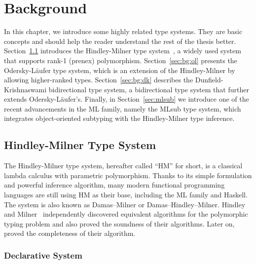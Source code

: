 \chapter{Background}
\label{chap:Background}

In this chapter, we introduce some highly related type systems.
They are basic concepts and should help the reader
understand the rest of the thesis better.
Section~\ref{sec:bg:hm} introduces the
Hindley-Milner type system~\citep{hindley1969principal,
milner1978theory,damas1982principal},
a widely used system that supports rank-1 (prenex) polymorphism.
Section~\ref{sec:bg:ol} presents the Odersky-L\"aufer type system,
which is an extension of the Hindley-Milner by allowing higher-ranked types.
Section~\ref{sec:bg:dk} describes the Dunfield-Krishnaswami
bidirectional type system,
a bidirectional type system that further extends Odersky-L\"aufer's.
Finally, in Section~\ref{sec:mlsub} we introduce
one of the recent advancements in the ML family,
namely the MLsub type system,
which integrates object-oriented subtyping with the Hindley-Milner type inference.


\section{Hindley-Milner Type System}\label{sec:bg:hm}

The Hindley-Milner type system, hereafter called ``HM'' for short,
is a classical lambda calculus with parametric polymorphism.
Thanks to its simple formulation and powerful inference algorithm,
many modern functional programming languages are still using HM as their base,
including the ML family and Haskell.
The system is also known as Damas–Milner or Damas–Hindley–Milner.
Hindley~\citep{hindley1969principal} and Milner~\citep{milner1978theory}
independently discovered equivalent algorithms for the polymorphic typing problem
and also proved the soundness of their algorithms.
Later on, \citet{damas1982principal} proved the completeness of their
algorithm.

\subsection{Declarative System}

